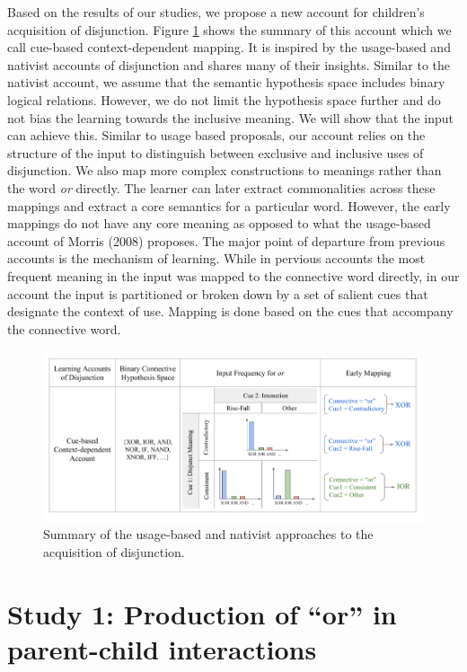 \documentclass[,man,floatsintext]{apa6}
\begin{document}
Based on the results of our studies, we propose a new account for children's acquisition of disjunction. Figure \ref{fig:cueBasedAccount} shows the summary of this account which we call cue-based context-dependent mapping. It is inspired by the usage-based and nativist accounts of disjunction and shares many of their insights. Similar to the nativist account, we assume that the semantic hypothesis space includes binary logical relations. However, we do not limit the hypothesis space further and do not bias the learning towards the inclusive meaning. We will show that the input can achieve this. Similar to usage based proposals, our account relies on the structure of the input to distinguish between exclusive and inclusive uses of disjunction. We also map more complex constructions to meanings rather than the word \emph{or} directly. The learner can later extract commonalities across these mappings and extract a core semantics for a particular word. However, the early mappings do not have any core meaning as opposed to what the usage-based account of Morris (2008) proposes. The major point of departure from previous accounts is the mechanism of learning. While in pervious accounts the most frequent meaning in the input was mapped to the connective word directly, in our account the input is partitioned or broken down by a set of salient cues that designate the context of use. Mapping is done based on the cues that accompany the connective word.

\begin{figure}[tb]

{\centering \includegraphics{figs/cueBasedAccount-1} 

}

\caption{Summary of the usage-based and nativist approaches to the acquisition of disjunction.}\label{fig:cueBasedAccount}
\end{figure}

\hypertarget{study-1-production-of-or-in-parent-child-interactions}{%
\section{\texorpdfstring{Study 1: Production of \enquote{or} in parent-child interactions}{Study 1: Production of ``or'' in parent-child interactions}}\label{study-1-production-of-or-in-parent-child-interactions}}
\end{document}
